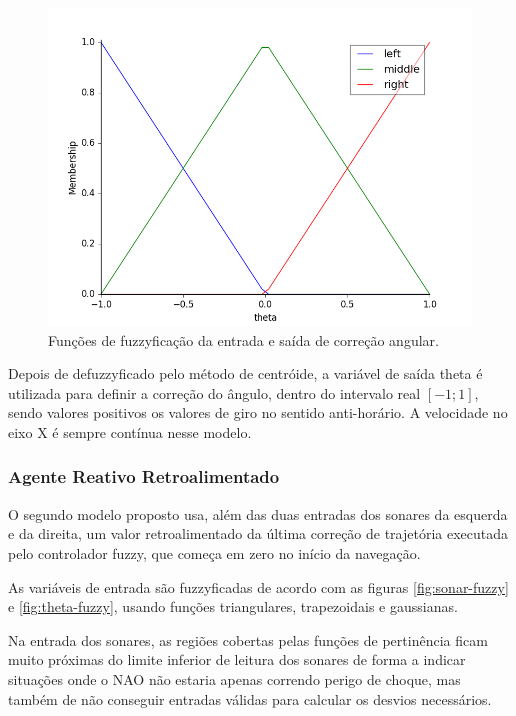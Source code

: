 \documentclass[twoside,conference,a4paper]{IEEEtran}
\begin{document}
\begin{figure}[ht]
\centering
\includegraphics[width=1\hsize]{figuras/theta_fuzzy0.png}
\caption{Funções de fuzzyficação da entrada e saída de correção angular.}
\label{fig:theta-fuzzy0}
\end{figure}

Depois de defuzzyficado pelo método de centróide, a variável de saída theta é utilizada para definir a  correção do ângulo, dentro do intervalo real $[-1;1]$, sendo valores positivos os valores de giro no sentido anti-horário. A velocidade no eixo X é sempre contínua nesse modelo.

\subsubsection*{Agente Reativo Retroalimentado}
O segundo modelo proposto usa, além das duas entradas dos sonares da esquerda e da direita, um valor retroalimentado da última correção de trajetória executada pelo controlador fuzzy, que começa em zero no início da navegação.

As variáveis de entrada são fuzzyficadas de acordo com as figuras \ref{fig:sonar-fuzzy} e \ref{fig:theta-fuzzy}, usando funções triangulares, trapezoidais e gaussianas.

Na entrada dos sonares, as regiões cobertas pelas funções de pertinência ficam muito próximas do limite inferior de leitura dos sonares de forma a indicar situações onde o NAO não estaria apenas correndo perigo de choque, mas também de não conseguir entradas válidas para calcular os desvios necessários.
\end{document}
